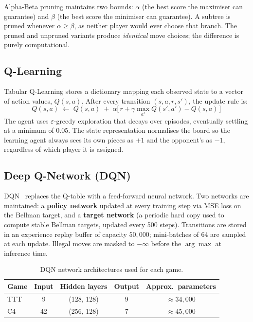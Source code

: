 \documentclass[11pt,a4paper]{article}
\begin{document}
Alpha-Beta pruning maintains two bounds: $\alpha$ (the best score the maximiser can guarantee) and
$\beta$ (the best score the minimiser can guarantee). A subtree is pruned whenever $\alpha \geq \beta$,
as neither player would ever choose that branch. The pruned and unpruned variants produce \emph{identical}
move choices; the difference is purely computational.

\subsection{Q-Learning}

Tabular Q-Learning stores a dictionary mapping each observed state to a vector of action values,
$Q(s, a)$. After every transition $(s, a, r, s')$, the update rule is:
\[
Q(s, a) \;\leftarrow\; Q(s, a) \;+\; \alpha \bigl[\, r + \gamma \max_{a'} Q(s', a') - Q(s, a) \,\bigr]
\]
The agent uses $\varepsilon$-greedy exploration that decays over episodes, eventually settling at a
minimum of $0.05$. The state representation normalises the board so the learning agent always sees
its own pieces as $+1$ and the opponent's as $-1$, regardless of which player it is assigned.

\subsection{Deep Q-Network (DQN)}

DQN~\cite{mnih2015} replaces the Q-table with a feed-forward neural network. Two networks are
maintained: a \textbf{policy network} updated at every training step via MSE loss on the Bellman
target, and a \textbf{target network} (a periodic hard copy used to compute stable Bellman targets,
updated every 500 steps). Transitions are stored in an experience replay buffer of capacity $50{,}000$;
mini-batches of 64 are sampled at each update. Illegal moves are masked to $-\infty$ before the
$\arg\max$ at inference time.

\begin{table}[H]
\centering
\caption{DQN network architectures used for each game.}
\label{tab:dqn_arch}
\begin{tabular}{lcccc}
\toprule
Game & Input & Hidden layers & Output & Approx.\ parameters \\
\midrule
TTT  & 9  & (128, 128) & 9 & $\approx 34{,}000$ \\
C4   & 42 & (256, 128) & 7 & $\approx 45{,}000$ \\
\bottomrule
\end{tabular}
\end{table}
\end{document}
